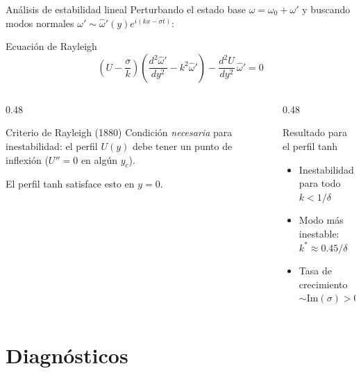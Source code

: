 \documentclass[aspectratio=169, 12pt]{beamer}
\begin{document}
\begin{frame}{Análisis de estabilidad lineal}
  Perturbando el estado base $\omega = \omega_0 + \omega'$ y
  buscando modos normales $\omega' \sim \hat{\omega}'(y)e^{i(kx-\sigma t)}$:

  \begin{block}{Ecuación de Rayleigh}
    \[
      \left(U - \frac{\sigma}{k}\right)
      \left(\frac{d^2\hat{\omega}'}{dy^2} - k^2\hat{\omega}'\right)
      - \frac{d^2U}{dy^2}\,\hat{\omega}' = 0
    \]
  \end{block}

  \vspace{0.4em}
  \begin{columns}
    \begin{column}{0.48\textwidth}
      \begin{block}{Criterio de Rayleigh (1880)}
        Condición \emph{necesaria} para inestabilidad:
        el perfil $U(y)$ debe tener un punto de inflexión
        ($U'' = 0$ en algún $y_c$).

        \vspace{0.3em}
        El perfil tanh satisface esto en $y=0$.
      \end{block}
    \end{column}
    \begin{column}{0.48\textwidth}
      \begin{alertblock}{Resultado para el perfil tanh}
        \begin{itemize}
          \item Inestabilidad para todo $k < 1/\delta$
          \item Modo más inestable: $k^* \approx 0.45/\delta$
          \item Tasa de crecimiento $\sim \text{Im}(\sigma) > 0$
        \end{itemize}
      \end{alertblock}
    \end{column}
  \end{columns}
\end{frame}

\section{Diagnósticos}
\end{document}
